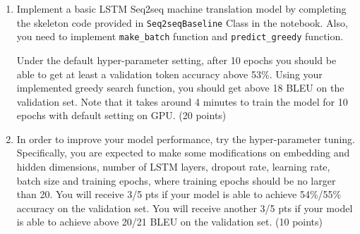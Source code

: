 \documentclass[twoside,10pt]{article}
\begin{document}
\begin{enumerate}[label=(\alph*)]
    \item Implement a basic LSTM Seq2seq machine translation model by completing the skeleton code provided in \texttt{Seq2seqBaseline} Class in the notebook. Also, you need to implement \texttt{make\_batch} function and \texttt{predict\_greedy} function. 
    
    Under the default hyper-parameter setting, after 10 epochs you should be able to get at least a validation token accuracy above 53\%. Using your implemented greedy search function, you should get above 18 BLEU on the validation set. Note that it takes around 4 minutes to train the model for 10 epochs with default setting on GPU. (20 points)
    
        \item In order to improve your model performance, try the hyper-parameter tuning. Specifically, you are expected to make some modifications on embedding and hidden dimensions, number of LSTM layers, dropout rate, learning rate, batch size and training epochs, where training epochs should be no larger than 20. You will receive 3/5 pts if your model is able to achieve 54\%/55\% accuracy on the validation set.  You will receive another 3/5 pts if your model is able to achieve above 20/21 BLEU on the validation set. (10 points)
    
\end{enumerate}
\end{document}
